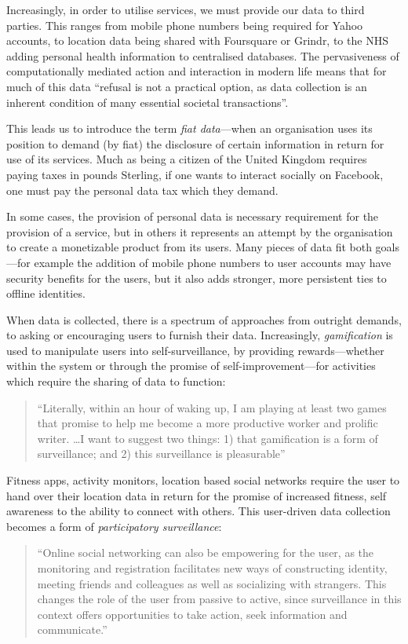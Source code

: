 \documentclass{IOS-Book-Article}     %
\begin{document}
Increasingly, in order to utilise services, we must provide our data to third
parties. This ranges from mobile phone numbers being required for Yahoo
accounts, to location data being shared with Foursquare or Grindr, to the NHS
adding personal health information to centralised databases. 
The pervasiveness of computationally mediated action and interaction in modern
life means that for much of this data ``refusal is not a practical option, as
data collection is an inherent condition of many essential societal
transactions''\cite{brunton2011vernacular}. 

This leads us to introduce the term 
\emph{fiat data}---when an
organisation uses its position to demand (by fiat) the disclosure of certain
information in return for use of its services. 
Much as being a citizen of the United Kingdom requires paying taxes in pounds
Sterling, if one wants to interact socially on Facebook, one must pay the
personal data tax which they demand. 

In some cases, the provision of personal data is
necessary requirement for the provision of a service, but in others
it represents an attempt by the organisation to create a monetizable product from
its users. Many pieces of data fit both goals---for example the addition of 
mobile phone numbers to user accounts may have security benefits for the users,
but it also adds stronger, more persistent ties to offline identities.

When data is collected, there is a spectrum of approaches from outright demands, 
to asking or encouraging users to furnish their data.
Increasingly, \emph{gamification} is used to manipulate
users into self-surveillance, by providing rewards---whether within the system
or through the promise of self-improvement---for activities which require the
sharing of data to function:
\begin{quote}``Literally, within an hour of waking up, I am playing at least 
two games that promise to help me become a more productive
worker and prolific writer. \ldots I want to suggest two things: 1) that gamification is a form of
surveillance; and 2) this surveillance is
pleasurable''~\cite{whitson2013gaming}\end{quote}
Fitness apps, activity monitors, location based social networks require the
user to hand over their location data in return for the promise of increased
fitness, self awareness to the ability to connect with others. 
This user-driven data collection becomes a form of \emph{participatory surveillance}:
\begin{quote}
``Online social networking can also be empowering for the user, as the monitoring and 
registration facilitates new ways of constructing identity, meeting friends and colleagues 
as well as socializing with strangers. This changes the role of the user from passive to 
active, since surveillance in this context offers opportunities to take action, seek 
information and communicate.''~\cite{albrechtslund2008online}
\end{quote} 
\end{document}
